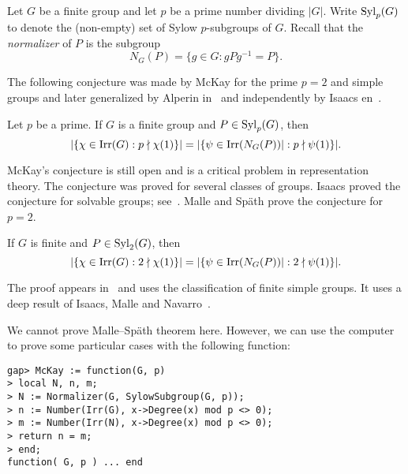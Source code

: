 \chapter{}

\label{McKay}

Let $G$ be a finite group and let $p$ be a prime number dividing
$|G|$. Write $\mathrm{Syl}_p(G)$ to denote the (non-empty) set of Sylow 
$p$-subgroups of $G$. Recall that 
the \emph{normalizer} of $P$ is the subgroup
\[
N_G(P)=\{g\in G:gPg^{-1}=P\}.
\]

The following conjecture was made by McKay for the prime $p=2$ and simple groups 
and later generalized by Alperin in~\cite{MR0404417} and independently
by Isaacs en~\cite{MR332945}. 

\begin{conjecture}[McKay]
\label{conjecture:McKay}
Let $p$ be a prime. If  
$G$ is a finite group and $P\in\mathrm{Syl}_p(G)$, then 
\[
|\{\chi\in\operatorname{Irr}(G):p\nmid \chi(1)\}|
=|\{\psi\in\operatorname{Irr}(N_G(P))|:p\nmid\psi(1)\}|.
\]
\end{conjecture}

McKay's conjecture is still open and is a critical problem in representation theory. 
The conjecture was proved for several classes of groups. Isaacs 
proved the conjecture for solvable groups; see~\cite{MR332945,MR3791517}. 
Malle and Sp\"ath prove the conjecture for $p=2$. 

\begin{theorem}
If $G$ is finite and $P\in\mathrm{Syl}_2(G)$,
then 
\[
|\{\chi\in\operatorname{Irr}(G):2\nmid \chi(1)\}|
=|\{\psi\in\operatorname{Irr}(N_G(P))|:2\nmid\psi(1)\}|.
\]
\end{theorem}

The proof appears in~\cite{MR3549625} and uses the classification of 
finite simple groups. It uses a deep result of 
Isaacs, Malle and Navarro~\cite{MR2336079}. 

We cannot prove Malle--Sp\"ath theorem here. However, 
we can use the computer to prove some particular cases
with the following function: 

\begin{lstlisting}
gap> McKay := function(G, p)
> local N, n, m;
> N := Normalizer(G, SylowSubgroup(G, p));
> n := Number(Irr(G), x->Degree(x) mod p <> 0);
> m := Number(Irr(N), x->Degree(x) mod p <> 0);
> return n = m;
> end;
function( G, p ) ... end
\end{lstlisting}

